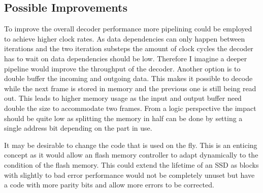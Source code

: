 \subsection{Possible Improvements}
To improve the overall decoder performance more pipelining could be employed to achieve higher clock rates. As data dependencies can only happen between iterations and the two iteration substeps the amount of clock cycles the decoder has to wait on data dependencies should be low. Therefore I imagine a deeper pipeline would improve the throughput of the decoder. Another option is to double buffer the incoming and outgoing data. This makes it possible to decode while the next frame is stored in memory and the previous one is still being read out. This leads to higher memory usage as the input and output buffer need double the size to accommodate two frames. From a logic perspective the impact should be quite low as splitting the memory in half can be done by setting a single address bit depending on the part in use.

It may be desirable to change the code that is used on the fly. This is an enticing concept as it would allow an flash memory controller to adapt dynamically to the condition of the flash memory. This could extend the lifetime of an SSD as blocks with slightly to bad error performance would not be completely unuset but have a code with more parity bits and allow more errors to be corrected.

